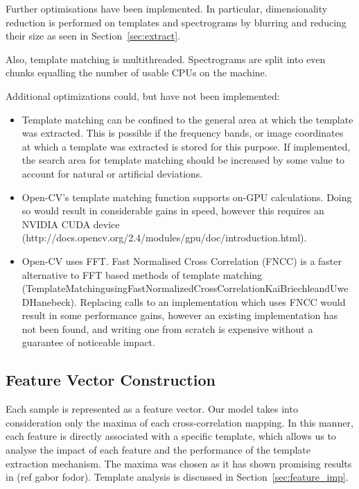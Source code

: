 Further optimisations have been implemented.
In particular, dimensionality reduction is performed on templates and
spectrograms by blurring and reducing their size as seen in
Section~\ref{sec:extract}.

Also, template matching is multithreaded.
Spectrograms are split into even chunks equalling the number of usable CPUs on
the machine.

Additional optimizations could, but have not been implemented:
\begin{itemize}[noitemsep]
  \item Template matching can be confined to the general area at which the template
    was extracted.
    This is possible if the frequency bands, or image coordinates at which a
    template was extracted is stored for this purpose.
    If implemented, the search area for template matching should be increased by some
    value to account for natural or artificial deviations.

  \item Open-CV's template matching function supports on-GPU calculations.
    Doing so would result in considerable gains in speed, however this requires
    an NVIDIA CUDA device (http://docs.opencv.org/2.4/modules/gpu/doc/introduction.html).

  \item Open-CV uses FFT.
    Fast Normalised Cross Correlation (FNCC) is a faster alternative to FFT based
    methods of template matching (TemplateMatchingusingFastNormalizedCrossCorrelationKaiBriechleandUweDHanebeck).
    Replacing calls to an implementation which uses FNCC would result in some 
    performance gains, however an existing implementation has not been found,
    and writing one from scratch is expensive without a guarantee of noticeable
    impact.
\end{itemize}

\subsection{Feature Vector Construction}
Each sample is represented as a feature vector.
Our model takes into consideration only the maxima of each cross-correlation
mapping.
In this manner, each feature is directly associated with a specific template,
which allows us to analyse the impact of each feature and the performance of the
template extraction mechanism.
The maxima was chosen as it has shown promising results in (ref gabor fodor).
Template analysis is discussed in Section~\ref{sec:feature_imp}.

